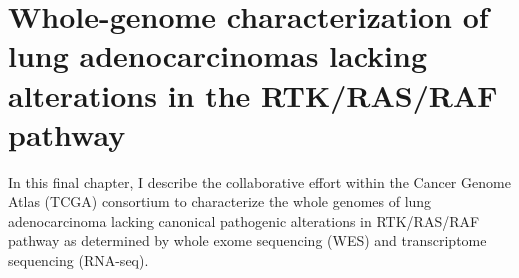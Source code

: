 \documentclass[phd,tocprelim]{cornell}
\begin{document}

\chapter{Whole-genome characterization of lung adenocarcinomas lacking alterations in the RTK/RAS/RAF pathway}

In this final chapter, I describe the collaborative effort within the Cancer Genome Atlas (TCGA) consortium to characterize the whole genomes of lung adenocarcinoma lacking canonical pathogenic alterations in RTK/RAS/RAF pathway as determined by whole exome sequencing (WES) and transcriptome sequencing (RNA-seq).
\end{document}
